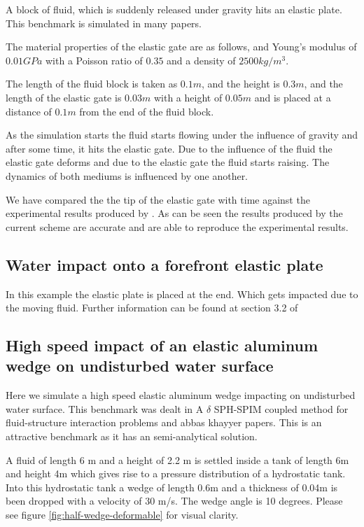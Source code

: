 \documentclass[preprint,12pt]{elsarticle}
\begin{document}
A block of fluid, which is suddenly released under gravity hits an elastic
plate. This benchmark is simulated in many papers.

The material properties of the elastic gate are as follows, and Young's
modulus of $0.01 GPa$ with a Poisson ratio of $0.35$ and a density of
$2500 kg/m^3$.

The length of the fluid block is taken as $0.1m$, and the height is $0.3m$,
and the length of the elastic gate is $0.03m$ with a height of $0.05m$ and is
placed at a distance of $0.1m$ from the end of the fluid block.


As the simulation starts the fluid starts flowing under the influence of
gravity and after some time, it hits the elastic gate. Due to the influence of
the fluid the elastic gate deforms and due to the elastic gate the fluid
starts raising. The dynamics of both mediums is influenced by one another.


We have compared the the tip of the elastic gate with time against the
experimental results produced by \cite{xxx}. As can be seen the results
produced by the current scheme are accurate and are able to reproduce the
experimental results.





\subsection{Water impact onto a forefront elastic plate}
\label{sec:water-impact-forefront}

In this example the elastic plate is placed at the end. Which gets
impacted due to the moving fluid. Further information can be found at
section 3.2 of \cite{liu2013numerical}




\subsection{High speed impact of an elastic aluminum wedge on undisturbed
  water surface}
\label{sec:wedge-impact-on-water}

Here we simulate a high speed elastic aluminum wedge impacting on undisturbed
water surface. This benchmark was dealt in
{A $\delta$ SPH-SPIM coupled method for fluid-structure interaction problems} and
{abbas khayyer} papers.
This is an attractive benchmark as it has an semi-analytical solution.

A fluid of length 6 m and a height of 2.2 m is settled inside a tank of length
6m and height 4m which gives rise to a pressure distribution of a hydrostatic
tank. Into this hydrostatic tank a wedge of length 0.6m and a thickness of
0.04m is been dropped with a velocity of 30 m/s. The wedge angle is 10
degrees. Please see figure \ref{fig:half-wedge-deformable} for visual clarity.
\end{document}
